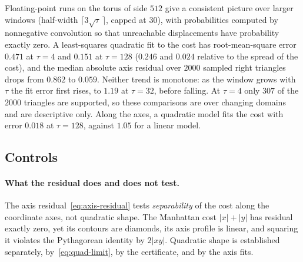 \documentclass[11pt]{article}
\begin{document}
Floating-point runs on the torus of side $512$ give a consistent picture over larger windows (half-width $\lceil3\sqrt\tau\,\rceil$, capped at $30$), with probabilities computed by nonnegative convolution so that unreachable displacements have probability exactly zero.
A least-squares quadratic fit to the cost has root-mean-square error $0.471$ at $\tau=4$ and $0.151$ at $\tau=128$ ($0.246$ and $0.024$ relative to the spread of the cost), and the median absolute axis residual over $2000$ sampled right triangles drops from $0.862$ to $0.059$.
Neither trend is monotone: as the window grows with $\tau$ the fit error first rises, to $1.19$ at $\tau=32$, before falling.
At $\tau=4$ only $307$ of the $2000$ triangles are supported, so these comparisons are over changing domains and are descriptive only.
Along the axes, a quadratic model fits the cost with error $0.018$ at $\tau=128$, against $1.05$ for a linear model.

\subsection{Controls}

\paragraph{What the residual does and does not test.}
The axis residual~\eqref{eq:axis-residual} tests \emph{separability} of the cost along the coordinate axes, not quadratic shape.
The Manhattan cost $|x|+|y|$ has residual exactly zero, yet its contours are diamonds, its axis profile is linear, and squaring it violates the Pythagorean identity by $2|xy|$.
Quadratic shape is established separately, by~\eqref{eq:quad-limit}, by the certificate, and by the axis fits.
\end{document}
